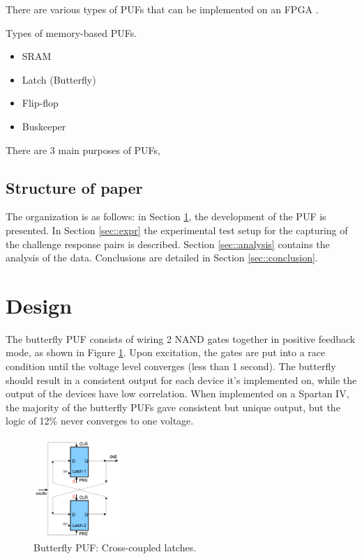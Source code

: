 	There are various types of PUFs that can be implemented on an FPGA \cite{VanHerrewege2015}. 

	\cite{VanHerrewege2015} 
	Types of memory-based PUFs.
		\begin{itemize}
			\item SRAM 
			\item Latch (Butterfly) 	\cite{Kumar2008}
			\item Flip-flop \cite{Maes2008,Leest2010}
			\item Buskeeper \cite{Simons2012}
		\end{itemize}

	There are 3 main purposes of PUFs, 
\subsection{Structure of paper}
	The organization is as follows: in Section \ref{sec::des_impl}, the development of the PUF is presented.  In Section \ref{sec::expr} the experimental test setup for the capturing of the challenge response pairs is described. Section \ref{sec::analysis} contains the analysis of the data. Conclusions are detailed in Section \ref{sec::conclusion}. 


\section{Design} \label{sec::des_impl}
	The butterfly PUF consists of wiring 2 NAND gates together in positive feedback mode, as shown in Figure \ref{fig:bfly}. Upon excitation, the gates are put into a race condition until the voltage level converges (less than 1 second). The butterfly should result in a consistent output for each device it's implemented on, while the output of the devices have low correlation. When implemented on a Spartan IV, the majority of the butterfly PUFs gave consistent but unique output, but the logic of 12\% never converges to one voltage. 
		\begin{figure}[tbph]
			\centering
			\includegraphics[width=0.3\textwidth]{bfly.png}
			\caption{Butterfly PUF: Cross-coupled latches.}\label{fig:bfly}
		\end{figure}

